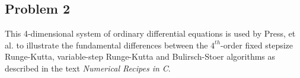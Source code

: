 \medskip
\begin{center}
\end{center}
\medskip



\subsection{Problem 2}

\noindent  This 4-dimensional system of ordinary differential equations is used by Press, et al. \cite{press1,vetter1}
to illustrate the fundamental differences between the $4^{th}$-order fixed stepsize Runge-Kutta, variable-step
Runge-Kutta and Bulirsch-Stoer algorithms as described in the text {\em Numerical Recipes in C}.  


